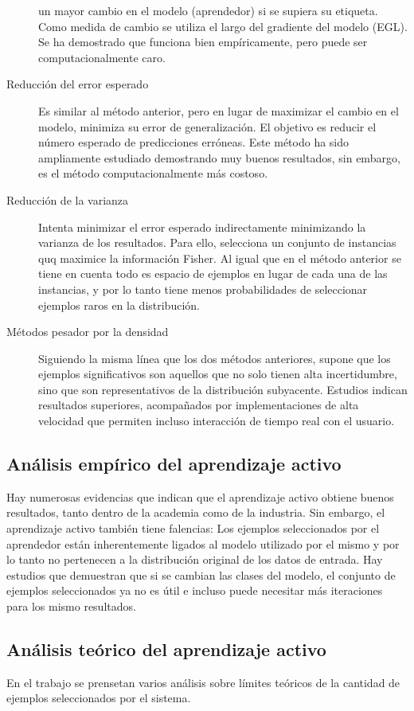 \documentclass[11pt,spanish]{article}
\begin{document}
\begin{description}
    un mayor cambio en el modelo (aprendedor) si se supiera su etiqueta. Como
    medida de cambio se utiliza el largo del gradiente del modelo (EGL). Se ha
    demostrado que funciona bien empíricamente, pero puede ser
    computacionalmente caro.
    \item[Reducción del error esperado] Es similar al método anterior, pero en
    lugar de maximizar el cambio en el modelo, minimiza su error de
    generalización. El objetivo es reducir el número esperado de predicciones
    erróneas. Este método ha sido ampliamente estudiado demostrando muy buenos
    resultados, sin embargo, es el método computacionalmente más costoso.
    \item[Reducción de la varianza] Intenta minimizar el error esperado
    indirectamente minimizando la varianza de los resultados. Para ello,
    selecciona un conjunto de instancias quq maximice la información Fisher. Al
    igual que en el método anterior se tiene en cuenta todo es espacio de
    ejemplos en lugar de cada una de las instancias, y por lo tanto tiene menos
    probabilidades de seleccionar ejemplos raros en la distribución.
    \item[Métodos pesador por la densidad] Siguiendo la misma línea que los dos
    métodos anteriores, supone que los ejemplos significativos son aquellos
    que no solo tienen alta incertidumbre, sino que son representativos
    de la distribución subyacente. Estudios indican resultados superiores,
    acompañados por implementaciones de alta velocidad que permiten incluso
    interacción de tiempo real con el usuario.
\end{description}

\subsection{Análisis empírico del aprendizaje activo}
Hay numerosas evidencias que indican que el aprendizaje activo obtiene buenos
resultados, tanto dentro de la academia como de la industria. Sin embargo,
el aprendizaje activo también tiene falencias: Los ejemplos seleccionados por
el aprendedor están inherentemente
ligados al modelo utilizado por el mismo y por lo tanto no pertenecen a la
distribución original de los datos de entrada. Hay estudios que demuestran
que si se cambian las clases del modelo, el conjunto de ejemplos
seleccionados ya no es útil e incluso puede necesitar más iteraciones para
los mismo resultados.

\subsection{Análisis teórico del aprendizaje activo}
En el trabajo se prensetan varios análisis sobre límites teóricos de la cantidad
de ejemplos seleccionados por el sistema.
\end{document}
